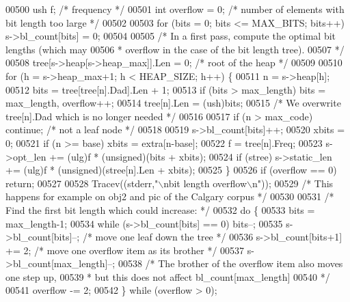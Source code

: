 \begin{DoxyCode}
{{{{{{{{{00500     ush f;              \textcolor{comment}{/* frequency */}
00501     \textcolor{keywordtype}{int} overflow = 0;   \textcolor{comment}{/* number of elements with bit length too large */}
00502 
00503     \textcolor{keywordflow}{for} (bits = 0; bits <= MAX\_BITS; bits++) s->bl\_count[bits] = 0;
00504 
00505     \textcolor{comment}{/* In a first pass, compute the optimal bit lengths (which may}
00506 \textcolor{comment}{     * overflow in the case of the bit length tree).}
00507 \textcolor{comment}{     */}
00508     tree[s->heap[s->heap\_max]].Len = 0; \textcolor{comment}{/* root of the heap */}
00509 
00510     for (h = s->heap\_max+1; h < HEAP\_SIZE; h++) \{
00511         n = s->heap[h];
00512         bits = tree[tree[n].Dad].Len + 1;
00513         \textcolor{keywordflow}{if} (bits > max\_length) bits = max\_length, overflow++;
00514         tree[n].Len = (ush)bits;
00515         \textcolor{comment}{/* We overwrite tree[n].Dad which is no longer needed */}
00516 
00517         \textcolor{keywordflow}{if} (n > max\_code) \textcolor{keywordflow}{continue}; \textcolor{comment}{/* not a leaf node */}
00518 
00519         s->bl\_count[bits]++;
00520         xbits = 0;
00521         \textcolor{keywordflow}{if} (n >= base) xbits = extra[n-base];
00522         f = tree[n].Freq;
00523         s->opt\_len += (ulg)f * (\textcolor{keywordtype}{unsigned})(bits + xbits);
00524         \textcolor{keywordflow}{if} (stree) s->static\_len += (ulg)f * (\textcolor{keywordtype}{unsigned})(stree[n].Len + xbits);
00525     \}
00526     \textcolor{keywordflow}{if} (overflow == 0) \textcolor{keywordflow}{return};
00527 
00528     Tracev((stderr,\textcolor{stringliteral}{"\(\backslash\)nbit length overflow\(\backslash\)n"}));
00529     \textcolor{comment}{/* This happens for example on obj2 and pic of the Calgary corpus */}
00530 
00531     \textcolor{comment}{/* Find the first bit length which could increase: */}
00532     \textcolor{keywordflow}{do} \{
00533         bits = max\_length-1;
00534         \textcolor{keywordflow}{while} (s->bl\_count[bits] == 0) bits--;
00535         s->bl\_count[bits]--;      \textcolor{comment}{/* move one leaf down the tree */}
00536         s->bl\_count[bits+1] += 2; \textcolor{comment}{/* move one overflow item as its brother */}
00537         s->bl\_count[max\_length]--;
00538         \textcolor{comment}{/* The brother of the overflow item also moves one step up,}
00539 \textcolor{comment}{         * but this does not affect bl\_count[max\_length]}
00540 \textcolor{comment}{         */}
00541         overflow -= 2;
00542     \} \textcolor{keywordflow}{while} (overflow > 0);
}}}}}}}}}
\end{DoxyCode}
